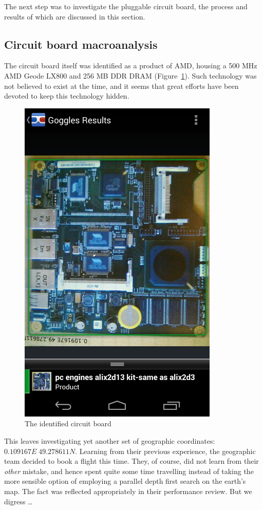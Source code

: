 The next step was to investigate the pluggable circuit board, the process and results of which are discussed in this section.

\subsection{Circuit board macroanalysis}
The circuit board itself was identified as a product of AMD, housing a 500 MHz AMD Geode LX800 and 256 MB DDR DRAM (Figure~\ref{fig:circuit-board}). Such technology was not believed to exist at the time, and it seems that great efforts have been devoted to keep this technology hidden.


\begin{figure}[h]
    \centering
    \includegraphics[width=0.8\columnwidth]{img/circuit-board.png}
    \caption{The identified circuit board}
    \label{fig:circuit-board}
\end{figure}

This leaves investigating yet another set of geographic coordinates: $0.109167E \; 49.278611N$. Learning from their previous experience, the geographic team decided to book a flight this time. They, of course, did not learn from their \emph{other} mistake, and hence spent quite some time travelling instead of taking the more sensible option of employing a parallel depth first search on the earth's map. The fact was reflected appropriately in their performance review. But we digress \ldots

